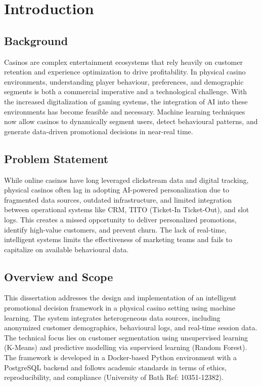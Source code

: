 

\chapter{Introduction}

\section{Background}
Casinos are complex entertainment ecosystems that rely heavily on customer retention and experience optimization to drive profitability. In physical casino environments, understanding player behaviour, preferences, and demographic segments is both a commercial imperative and a technological challenge. With the increased digitalization of gaming systems, the integration of AI into these environments has become feasible and necessary. Machine learning techniques now allow casinos to dynamically segment users, detect behavioural patterns, and generate data-driven promotional decisions in near-real time.

\section{Problem Statement}
While online casinos have long leveraged clickstream data and digital tracking, physical casinos often lag in adopting AI-powered personalization due to fragmented data sources, outdated infrastructure, and limited integration between operational systems like CRM, TITO (Ticket-In Ticket-Out), and slot logs. This creates a missed opportunity to deliver personalized promotions, identify high-value customers, and prevent churn. The lack of real-time, intelligent systems limits the effectiveness of marketing teams and fails to capitalize on available behavioural data.

\section{Overview and Scope}
This dissertation addresses the design and implementation of an intelligent promotional decision framework in a physical casino setting using machine learning. The system integrates heterogeneous data sources, including anonymized customer demographics, behavioural logs, and real-time session data. The technical focus lies on customer segmentation using unsupervised learning (K-Means) and predictive modelling via supervised learning (Random Forest). The framework is developed in a Docker-based Python environment with a PostgreSQL backend and follows academic standards in terms of ethics, reproducibility, and compliance (University of Bath Ref: 10351-12382).

